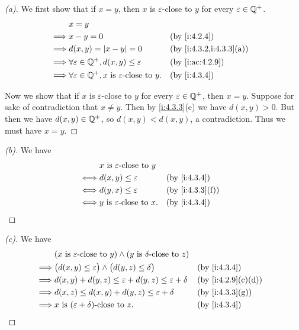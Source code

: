 \begin{proof}[(a)]
  We first show that if \(x = y\), then \(x\) is \(\varepsilon\)-close to \(y\) for every \(\varepsilon \in \mathbb{Q}^+\).
  \begin{align*}
             & x = y                                                                                                \\
    \implies & x - y = 0                                                               &  & \by{i:4.2.4}            \\
    \implies & d(x, y) = \abs{x - y} = 0                                               &  & \by{i:4.3.2,i:4.3.3}[a] \\
    \implies & \forall \varepsilon \in \Q^+, d(x, y) \leq \varepsilon                  &  & \by{i:ac:4.2.9}         \\
    \implies & \forall \varepsilon \in \Q^+, x \text{ is \(\varepsilon\)-close to } y. &  & \by{i:4.3.4}
  \end{align*}

  Now we show that if \(x\) is \(\varepsilon\)-close to \(y\) for every \(\varepsilon \in \mathbb{Q}^+\), then \(x = y\).
  Suppose for sake of contradiction that \(x \neq y\).
  Then by \cref{i:4.3.3}(e) we have \(d(x, y) > 0\).
  But then we have \(d(x, y) \in \mathbb{Q}^+\), so \(d(x, y) < d(x, y)\), a contradiction.
  Thus we must have \(x = y\).
\end{proof}

\begin{proof}[(b)]
  We have
  \begin{align*}
         & x \text{ is \(\varepsilon\)-close to } y                       \\
    \iff & d(x, y) \leq \varepsilon                  &  & \by{i:4.3.4}    \\
    \iff & d(y, x) \leq \varepsilon                  &  & \by{i:4.3.3}[f] \\
    \iff & y \text{ is \(\varepsilon\)-close to } x. &  & \by{i:4.3.4}
  \end{align*}
\end{proof}

\begin{proof}[(c)]
  We have
  \begin{align*}
             & (x \text{ is \(\varepsilon\)-close to } y) \land (y \text{ is \(\delta\)-close to } z)                        \\
    \implies & \big(d(x, y) \leq \varepsilon\big) \land \big(d(y, z) \leq \delta\big)                 &  & \by{i:4.3.4}      \\
    \implies & d(x, y) + d(y, z) \leq \varepsilon + d(y, z) \leq \varepsilon + \delta                 &  & \by{i:4.2.9}[c,d] \\
    \implies & d(x, z) \leq d(x, y) + d(y, z) \leq \varepsilon + \delta                               &  & \by{i:4.3.3}[g]   \\
    \implies & x \text{ is \((\varepsilon + \delta)\)-close to } z.                                   &  & \by{i:4.3.4}
  \end{align*}
\end{proof}

